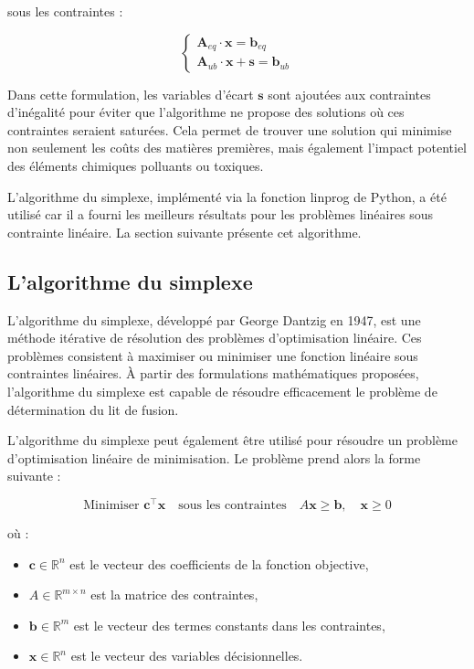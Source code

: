 \documentclass[12pt]{article}
\begin{document}
sous les contraintes :

$$
\begin{cases}
\mathbf{A}_{eq} \cdot \mathbf{x} = \mathbf{b}_{eq} \\
\mathbf{A}_{ub}  \cdot \mathbf{x} + \mathbf{s}  = \mathbf{b}_{ub} 
\end{cases}
$$

Dans cette formulation, les variables d'écart $\mathbf{s} $ sont ajoutées aux contraintes
d'inégalité pour éviter que l'algorithme ne propose des solutions où 
ces contraintes seraient saturées. Cela permet de trouver une solution 
qui minimise non seulement les coûts des matières premières, mais 
également l'impact potentiel des éléments chimiques polluants ou toxiques.






L'algorithme du simplexe, implémenté via la fonction linprog de Python, 
a été utilisé car il a fourni les meilleurs résultats pour les problèmes 
linéaires sous contrainte linéaire. La section suivante présente cet 
algorithme.


\subsection{L'algorithme du simplexe }


L'algorithme du simplexe, développé par George Dantzig en 1947, est une 
méthode itérative de résolution des problèmes d'optimisation linéaire. 
Ces problèmes consistent à maximiser ou minimiser une fonction linéaire 
sous contraintes linéaires. À partir des formulations mathématiques 
proposées, l'algorithme du simplexe est capable de résoudre efficacement 
le problème de détermination du lit de fusion.





L'algorithme du simplexe peut également être utilisé pour résoudre un 
problème d'optimisation linéaire de minimisation. Le problème prend alors 
la forme suivante :

\[
\text{Minimiser } \mathbf{c}^\top \mathbf{x} \quad \text{sous les contraintes} \quad A\mathbf{x} \geq \mathbf{b}, \quad \mathbf{x} \geq 0
\]

où :
\begin{itemize}
    \item \(\mathbf{c} \in \mathbb{R}^n\) est le vecteur des 
    coefficients de la fonction objective,
    \item \(A \in \mathbb{R}^{m \times n}\) est la matrice des contraintes,
    \item \(\mathbf{b} \in \mathbb{R}^m\) est le vecteur des termes 
    constants dans les contraintes,
    \item \(\mathbf{x} \in \mathbb{R}^n\) est le vecteur des variables 
    décisionnelles.
\end{itemize}
\end{document}
